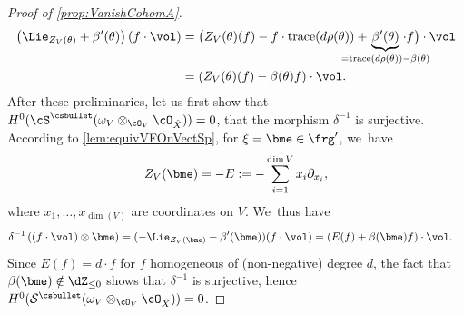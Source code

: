 \begin{proof}[Proof of \cref{prop:VanishCohomA}]
\begin{equation}
\begin{aligned}
\left(\Lie_{Z_V(\theta)}+\beta'(\theta)\right)(f\cdot \vol)
&=
\big(Z_V(\theta)(f)-f\cdot\textup{trace}(d\rho(\theta))+\hspace*{-8mm}\underbrace{\beta'(\theta)}_{=\textup{trace}(d\rho(\theta))-\beta(\theta)}\hspace*{-8mm}\cdot f\big)\cdot\vol\\
&=\left(Z_V(\theta)(f)-\beta(\theta)f\right)\cdot \vol.
\end{aligned}
\end{equation}
After these preliminaries, let us first show that $H^0(\cS^{\csbullet}(\omega_V\otimes_{\cO_V} \cO_{\hat{X}}))=0$, \ie that the morphism $\delta^{-1}$ is surjective.
According to \cref{lem:equivVFOnVectSp}, for $\xi=\bme\in\frg'$, we~have
\[
Z_V(\bme)=-E:=-\sum_{i=1}^{\dim V} x_i\partial_{x_i},
\]
where $x_1,\ldots,x_{\dim(V)}$ are coordinates on $V$. We~thus have
\begin{align*}
\delta^{-1}\left((f\cdot\vol)\otimes\bme\right) &=
(-\Lie_{Z_V(\bme)}-\beta'(\bme))(f\cdot\vol)=
(E(f)+\beta(\bme)f)\cdot\vol.
\end{align*}
Since $E(f) =d \cdot f$ for $f$ homogeneous of (non-negative) degree $d$, the fact that $\beta(\bme)\notin\dZ_{\leq 0}$ shows that $\delta^{-1}$ is surjective, hence $H^0(\mathcal S^{\csbullet}(\omega_V\otimes_{\cO_V} \cO_{\hat{X}})) = 0$.


\end{proof}
